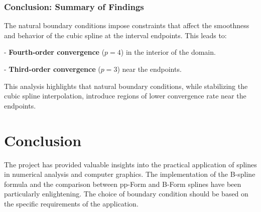 \documentclass{article}
\begin{document}
\subsubsection{Conclusion: Summary of Findings}
The natural boundary conditions impose constraints that affect the smoothness and behavior of the cubic spline at the interval endpoints. This leads to:\par
- \textbf{Fourth-order convergence} (\( p=4 \)) in the interior of the domain.\par
- \textbf{Third-order convergence} (\( p=3 \)) near the endpoints.\par

This analysis highlights that natural boundary conditions, while stabilizing the cubic spline interpolation, introduce regions of lower convergence rate near the endpoints.


\section{Conclusion}
The project has provided valuable insights into the practical application of splines in numerical analysis and computer graphics. The implementation of the B-spline formula and the comparison between pp-Form and B-Form splines have been particularly enlightening. The choice of boundary condition should be based on the specific requirements of the application.
\end{document}
